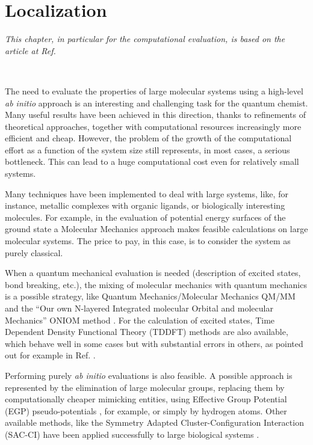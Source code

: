 \pagestyle{fancy}
\chapter{Localization}
\label{chp:localization}
\begin{center}
\textit{This chapter, in particular for the computational evaluation,
is based on the article at Ref. }
\end{center}
{\ }\\
\vspace{-1mm}

The need to evaluate the properties of large molecular systems using a high-level
\textit{ab initio} approach is an interesting and challenging task for the
quantum chemist. Many useful results have been achieved in this direction,
thanks to refinements of theoretical approaches, together with computational
resources increasingly more efficient and cheap.  However, the problem of
the growth of the computational effort as a function of the system size
still represents, in most cases, a serious bottleneck.  This can lead to a
huge computational cost even for relatively small systems.  

Many techniques have been implemented to deal with large systems, like, for
instance, metallic complexes with organic ligands, or biologically
interesting molecules.  For example, in the evaluation of potential energy
surfaces of the ground state a Molecular Mechanics approach makes feasible
calculations on large molecular systems. The price to pay, in this case, is
to consider the system as purely classical.

When a quantum mechanical evaluation is needed (description of excited states,
bond breaking, etc.), the mixing of molecular mechanics with
quantum mechanics is a possible strategy, like Quantum Mechanics/Molecular
Mechanics QM/MM \cite{jcc-11-700-1990} and the ``Our own N-layered Integrated
molecular Orbital and molecular Mechanics'' ONIOM method
\cite{jpc-100-19357-1996}. For the calculation of excited states,
Time Dependent Density Functional Theory (TDDFT) methods are also
available, which behave well in some cases but with substantial errors in
others, as pointed out for example in Ref. . 

Performing purely \textit{ab initio} evaluations is also feasible. A
possible approach is represented by the elimination of large molecular
groups, replacing them by computationally cheaper mimicking entities, using
Effective Group Potential (EGP) pseudo-potentials
\cite{jpca-105-198-2001,jpca-105-206-2001}, for example, or simply by
hydrogen atoms. Other available methods, like the Symmetry Adapted
Cluster-Configuration Interaction
(SAC-CI)\cite{jcp-68-2053-1978,cpl-59-362-1978,cpl-67-329-1979,cpl-67-334-1979}
have been applied successfully to large biological systems
\cite{cpl-250-437-1996}.

